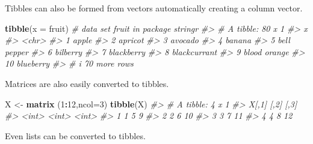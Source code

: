 \documentclass[
]{book}
\newenvironment{Shaded}{\begin{snugshade}}{\end{snugshade}}
\newcommand{\AttributeTok}[1]{\textcolor[rgb]{0.13,0.29,0.53}{#1}}
\newcommand{\CommentTok}[1]{\textcolor[rgb]{0.56,0.35,0.01}{\textit{#1}}}
\newcommand{\DecValTok}[1]{\textcolor[rgb]{0.00,0.00,0.81}{#1}}
\newcommand{\FunctionTok}[1]{\textcolor[rgb]{0.13,0.29,0.53}{\textbf{#1}}}
\newcommand{\NormalTok}[1]{#1}
\newcommand{\OtherTok}[1]{\textcolor[rgb]{0.56,0.35,0.01}{#1}}
\newcommand{\SpecialCharTok}[1]{\textcolor[rgb]{0.81,0.36,0.00}{\textbf{#1}}}
\begin{document}
Tibbles can also be formed from vectors automatically creating a column vector.

\begin{Shaded}
\begin{Highlighting}[]
\FunctionTok{tibble}\NormalTok{(}\AttributeTok{x =}\NormalTok{ fruit)   }\CommentTok{\# data set fruit in package stringr}
\CommentTok{\#\textgreater{} \# A tibble: 80 x 1}
\CommentTok{\#\textgreater{}    x           }
\CommentTok{\#\textgreater{}    \textless{}chr\textgreater{}       }
\CommentTok{\#\textgreater{}  1 apple       }
\CommentTok{\#\textgreater{}  2 apricot     }
\CommentTok{\#\textgreater{}  3 avocado     }
\CommentTok{\#\textgreater{}  4 banana      }
\CommentTok{\#\textgreater{}  5 bell pepper }
\CommentTok{\#\textgreater{}  6 bilberry    }
\CommentTok{\#\textgreater{}  7 blackberry  }
\CommentTok{\#\textgreater{}  8 blackcurrant}
\CommentTok{\#\textgreater{}  9 blood orange}
\CommentTok{\#\textgreater{} 10 blueberry   }
\CommentTok{\#\textgreater{} \# i 70 more rows}
\end{Highlighting}
\end{Shaded}

Matrices are also easily converted to tibbles.

\begin{Shaded}
\begin{Highlighting}[]
\NormalTok{X }\OtherTok{\textless{}{-}} \FunctionTok{matrix}\NormalTok{ (}\DecValTok{1}\SpecialCharTok{:}\DecValTok{12}\NormalTok{,}\AttributeTok{ncol=}\DecValTok{3}\NormalTok{)}
\FunctionTok{tibble}\NormalTok{(X)}
\CommentTok{\#\textgreater{} \# A tibble: 4 x 1}
\CommentTok{\#\textgreater{}   X[,1]  [,2]  [,3]}
\CommentTok{\#\textgreater{}   \textless{}int\textgreater{} \textless{}int\textgreater{} \textless{}int\textgreater{}}
\CommentTok{\#\textgreater{} 1     1     5     9}
\CommentTok{\#\textgreater{} 2     2     6    10}
\CommentTok{\#\textgreater{} 3     3     7    11}
\CommentTok{\#\textgreater{} 4     4     8    12}
\end{Highlighting}
\end{Shaded}

Even lists can be converted to tibbles.
\end{document}
